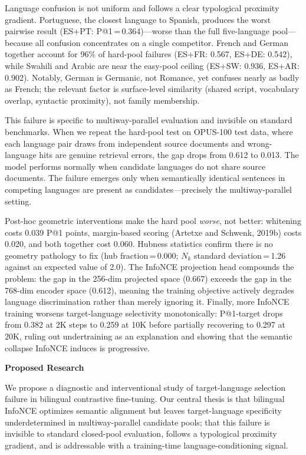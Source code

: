 \documentclass[11pt]{article}
\begin{document}
Language confusion is not uniform and follows a clear typological proximity gradient.
Portuguese, the closest language to Spanish, produces the worst pairwise result
(ES+PT: P@1\,=\,0.364)---worse than the full five-language pool---because all confusion
concentrates on a single competitor. French and German together account for 96\% of
hard-pool failures (ES+FR: 0.567, ES+DE: 0.542), while Swahili and Arabic are near the
easy-pool ceiling (ES+SW: 0.936, ES+AR: 0.902). Notably, German is Germanic, not Romance,
yet confuses nearly as badly as French; the relevant factor is surface-level similarity
(shared script, vocabulary overlap, syntactic proximity), not family membership.

This failure is specific to multiway-parallel evaluation and invisible on standard
benchmarks. When we repeat the hard-pool test on OPUS-100 test data, where each language
pair draws from independent source documents and wrong-language hits are genuine retrieval
errors, the gap drops from 0.612 to 0.013. The model performs normally when candidate
languages do not share source documents. The failure emerges only when semantically
identical sentences in competing languages are present as candidates---precisely the
multiway-parallel setting.

Post-hoc geometric interventions make the hard pool \emph{worse}, not better: whitening
costs 0.039 P@1 points, margin-based scoring (Artetxe and Schwenk, 2019b) costs 0.020,
and both together cost 0.060. Hubness statistics confirm there is no geometry pathology
to fix (hub fraction\,=\,0.000; $N_k$ standard deviation\,=\,1.26 against an expected
value of 2.0). The InfoNCE projection head compounds the problem: the gap in the 256-dim
projected space (0.667) exceeds the gap in the 768-dim encoder space (0.612), meaning the
training objective actively degrades language discrimination rather than merely ignoring
it. Finally, more InfoNCE training worsens target-language selectivity monotonically:
P@1-target drops from 0.382 at 2K steps to 0.259 at 10K before partially recovering to
0.297 at 20K, ruling out undertraining as an explanation and showing that the semantic
collapse InfoNCE induces is progressive.

\textbf{Proposed Research}

We propose a diagnostic and interventional study of target-language selection failure in
bilingual contrastive fine-tuning. Our central thesis is that bilingual InfoNCE optimizes
semantic alignment but leaves target-language specificity underdetermined in multiway-parallel
candidate pools; that this failure is invisible to standard closed-pool evaluation,
follows a typological proximity gradient, and is addressable with a training-time
language-conditioning signal.
\end{document}
